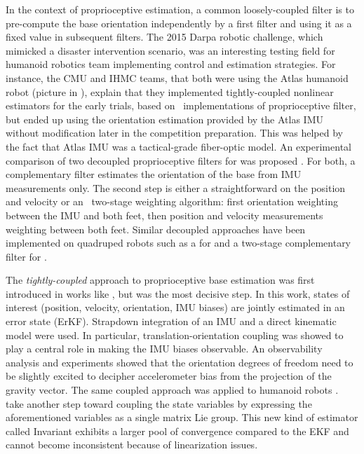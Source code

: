 In the context of proprioceptive estimation, a common loosely-coupled filter is to pre-compute the base orientation independently by a first filter and using it as a 
fixed value in subsequent filters. The 2015 Darpa robotic challenge, which mimicked a disaster intervention scenario, was an interesting testing field for humanoid robotics
team implementing control and estimation strategies. For instance, the CMU \cite{feng2015optimization} and IHMC 
\cite{johnson2015team} teams, that both were using the Atlas humanoid robot (picture in ), explain that they implemented tightly-coupled nonlinear estimators for the 
early trials, based on \adhoc\ implementations of proprioceptive filter, but ended up using the orientation estimation provided by the Atlas IMU without modification 
later in the competition preparation. This was helped by the fact that Atlas IMU was a tactical-grade fiber-optic model. 
An experimental comparison of two decoupled proprioceptive filters for  was proposed \cite{flayols2017experimental}. For both, a complementary filter estimates 
the orientation of the base from IMU measurements only. The second step is either a straightforward \KalmanF on the position and velocity or an \adhoc\ two-stage 
weighting algorithm: first orientation weighting between the IMU and both feet, then position and velocity measurements 
weighting between both feet. Similar decoupled approaches have been implemented on quadruped robots such as a \KalmanF for \cite{bledt2018cheetah} and a two-stage complementary filter for \cite{leziart2021implementation}.

The \textit{tightly-coupled} approach to proprioceptive base estimation was first introduced in works like \cite{chilian2011multisensor}, but \cite{bloesch2013state} was the most decisive step.
In this work, states of interest (position, velocity, orientation, IMU biases) are jointly estimated in an error state \KalmanF (ErKF). Strapdown integration of an IMU and 
a direct kinematic model were used. In particular, translation-orientation coupling was showed to play a central role in making the IMU biases observable. 
An observability analysis and experiments showed that the orientation degrees of freedom need to be slightly excited to decipher accelerometer bias from the projection of the 
gravity vector. The same coupled approach was applied to humanoid robots \cite{rotella2014state, fallon2014drift}.
\cite{hartley2020contact, lin2021deep} take another step toward coupling the state variables by expressing the aforementioned variables as a single matrix Lie group.
This new kind of estimator called Invariant \KalmanF \cite{barrau2018invariant} exhibits a larger pool of convergence compared to the EKF and cannot become 
inconsistent because of linearization issues. 

